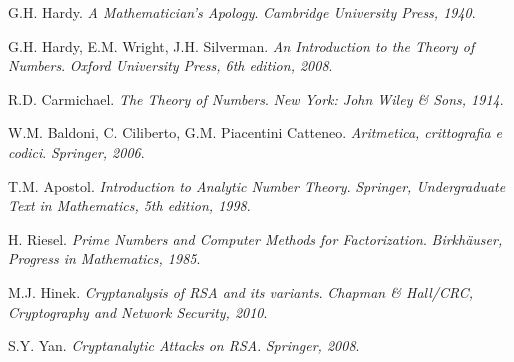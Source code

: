 \documentclass[twoside,symmetric,justified,openany,nobib]{tufte-book}
\begin{document}
\begin{thebibliography}{99}
\begin{tcolorbox}[enhanced, breakable, colback=white, colframe=white, check odd page, toggle left and right, grow to left by=0.5cm, grow to right by=\marginparwidth+\marginparsep, toggle enlargement=evenpage]

    G.H. Hardy.
    \textit{A Mathematician’s Apology}.
    \textit{Cambridge University Press, 1940}.
  

    G.H. Hardy, E.M. Wright, J.H. Silverman.
    \textit{An Introduction to the Theory of Numbers}.
    \textit{Oxford University Press, 6th edition, 2008}.
  

    R.D. Carmichael.
    \textit{The Theory of Numbers}.
    \textit{New York: John Wiley \& Sons, 1914}.
  

  

    W.M. Baldoni, C. Ciliberto, G.M. Piacentini Catteneo.
    \textit{Aritmetica, crittografia e codici}.
    \textit{Springer, 2006}.
  

    T.M. Apostol.
    \textit{Introduction to Analytic Number Theory}.
    \textit{Springer, Undergraduate Text in Mathematics, 5th edition, 1998}.
  

    H. Riesel.
    \textit{Prime Numbers and Computer Methods for Factorization}.
    \textit{Birkh\"auser, Progress in Mathematics, 1985}.
  

  

    M.J. Hinek.
    \textit{Cryptanalysis of RSA and its variants}.
    \textit{Chapman \& Hall/CRC, Cryptography and Network Security, 2010}.
  

    S.Y. Yan.
    \textit{Cryptanalytic Attacks on RSA}.
    \textit{Springer, 2008}.
  

\end{tcolorbox}
\end{thebibliography}
\end{document}

